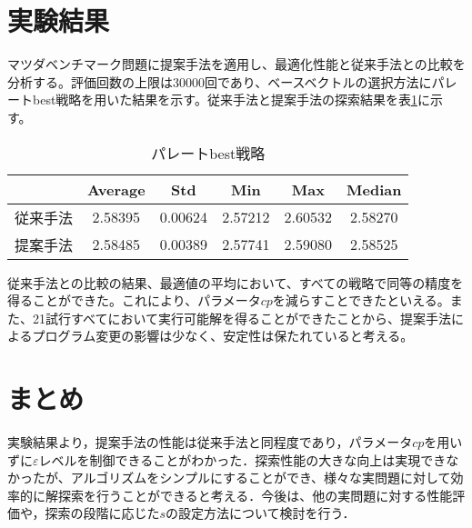 \documentclass[a4paper,twocolumn,10pt]{jarticle}
\begin{document}
\section{実験結果}
マツダベンチマーク問題に提案手法を適用し、最適化性能と従来手法との比較を分析する。評価回数の上限は30000回であり、ベースベクトルの選択方法にパレートbest戦略を用いた結果を示す。従来手法と提案手法の探索結果を表\ref{tbl:パレートbest}に示す。
\begin{table}[htbp]
\begin{center}
\caption{パレートbest戦略}
\label{tbl:パレートbest}
\begin{tabular}{|c|c|c|c|c|c|}
\hline
      & Average & Std & Min & Max & Median  \\ \hline
従来手法 & 2.58395	& 0.00624 & 2.57212 & 2.60532 & 2.58270\\ \hline
提案手法 & 2.58485 & 0.00389 & 2.57741 & 2.59080 & 2.58525\\ \hline
\end{tabular}
\end{center}
\end{table}

従来手法との比較の結果、最適値の平均において、すべての戦略で同等の精度を得ることができた。これにより、パラメータ$cp$を減らすことできたといえる。また、21試行すべてにおいて実行可能解を得ることができたことから、提案手法によるプログラム変更の影響は少なく、安定性は保たれていると考える。


\section{まとめ}
実験結果より，提案手法の性能は従来手法と同程度であり，パラメータ$cp$を用いずに$\varepsilon$レベルを制御できることがわかった．探索性能の大きな向上は実現できなかったが、アルゴリズムをシンプルにすることができ、様々な実問題に対して効率的に解探索を行うことができると考える．今後は、他の実問題に対する性能評価や，探索の段階に応じた$s$の設定方法について検討を行う．





\end{document}
